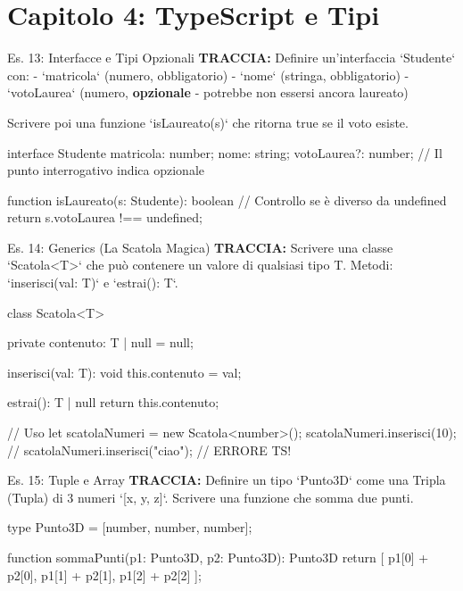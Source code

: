 \section{Capitolo 4: TypeScript e Tipi}

\begin{esercizio}{Es. 13: Interfacce e Tipi Opzionali}
\textbf{TRACCIA:} Definire un'interfaccia `Studente` con:
- `matricola` (numero, obbligatorio)
- `nome` (stringa, obbligatorio)
- `votoLaurea` (numero, \textbf{opzionale} - potrebbe non essersi ancora laureato)

Scrivere poi una funzione `isLaureato(s)` che ritorna true se il voto esiste.
\end{esercizio}

\begin{jsbox}
interface Studente {
    matricola: number;
    nome: string;
    votoLaurea?: number; // Il punto interrogativo indica opzionale
}

function isLaureato(s: Studente): boolean {
    // Controllo se è diverso da undefined
    return s.votoLaurea !== undefined;
}
\end{jsbox}

\begin{esercizio}{Es. 14: Generics (La Scatola Magica)}
\textbf{TRACCIA:} Scrivere una classe `Scatola<T>` che può contenere un valore di qualsiasi tipo T.
Metodi: `inserisci(val: T)` e `estrai(): T`.
\end{esercizio}

\begin{jsbox}
class Scatola<T> {
    private contenuto: T | null = null;
    
    inserisci(val: T): void {
        this.contenuto = val;
    }
    
    estrai(): T | null {
        return this.contenuto;
    }
}

// Uso
let scatolaNumeri = new Scatola<number>();
scatolaNumeri.inserisci(10);
// scatolaNumeri.inserisci("ciao"); // ERRORE TS!
\end{jsbox}

\begin{esercizio}{Es. 15: Tuple e Array}
\textbf{TRACCIA:} Definire un tipo `Punto3D` come una Tripla (Tupla) di 3 numeri `[x, y, z]`.
Scrivere una funzione che somma due punti.
\end{esercizio}

\begin{jsbox}
type Punto3D = [number, number, number];

function sommaPunti(p1: Punto3D, p2: Punto3D): Punto3D {
    return [
        p1[0] + p2[0],
        p1[1] + p2[1],
        p1[2] + p2[2]
    ];
}
\end{jsbox}

